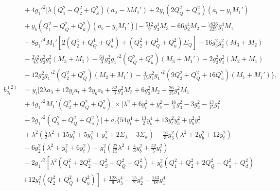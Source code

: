 \documentclass[preprint,amsmath,amssymb,aps,superscriptaddress,prd,
showpacs,floatfix,nofootinbib]{revtex4-1}
\begin{document}
\begin{subequations}
\begin{align}
\nonumber \\
& {} + 4 g_1'^2 \big [ \lambda \left ( Q_1^2 - Q_2^2 + Q_S^2 \right )
\left ( a_\lambda - \lambda M_1' \right ) + 2 y_t \left ( 2 Q_Q^2 + Q_u^2
\right ) \left ( a_t - y_t M_1' \right ) \nonumber \\
& {} + y_b \left ( Q_1^2 - Q_Q^2 + Q_d^2 \right ) \left ( a_b - y_b M_1'
\right ) \big ] - \frac{512}{9} g_3^4 M_3 - 66 g_2^4 M_2 -
\frac{7826}{225} g_1^4 M_1 \nonumber \\
& {} - 8 g_1'^4 M_1' \left [ 2 \left ( Q_2^4 + Q_Q^4 + Q_u^4 \right ) +
\left ( Q_2^2 + Q_Q^2 + Q_u^2 \right ) \Sigma_{Q} \right ] -
16 g_3^2 g_2^2 \left ( M_3 + M_2 \right ) \nonumber \\
& {} - \frac{272}{45} g_3^2 g_1^2 \left ( M_3 + M_1 \right ) -
\frac{64}{3} g_3^2 g_1'^2 \left ( Q_Q^2 + Q_u^2 \right )
\left ( M_3 + M_1' \right ) - 2 g_2^2 g_1^2 \left ( M_2 + M_1 \right )
\nonumber \\
& {} - 12 g_2^2 g_1'^2 \left ( Q_2^2 + Q_Q^2 \right ) \left ( M_2 + M_1'
\right ) - \frac{4}{15} g_1^2 g_1'^2 \left ( 9 Q_2^2 + Q_Q^2 + 16 Q_u^2
\right ) \left ( M_1 + M_1' \right ) \bigg \} ,
\label{eq:USSMTYu22BetaTwoLoop} \\
b_{a_t}^{(2)} &= y_t \bigg [ 2 \lambda a_\lambda + 12 y_t a_t + 2 y_b a_b +
\frac{32}{3} g_3^2 M_3 + 6 g_2^2 M_2 + \frac{26}{15} g_1^2 M_1 \nonumber \\
& {} + 4 g_1'^2 M_1' \left ( Q_2^2 + Q_Q^2 + Q_u^2 \right ) \bigg ] \times
\bigg [ \lambda^2 + 6 y_t^2 + y_b^2 - \frac{16}{3} g_3^2 - 3 g_2^2 -
\frac{13}{15} g_1^2 \nonumber \\
& {} - 2 g_1'^2 \left ( Q_2^2 + Q_Q^2 + Q_u^2 \right ) \bigg ] +
a_t \bigg \{ 54 y_t^4 + \frac{13}{2} y_b^4 + 13 y_t^2 y_b^2 + y_b^2 y_\tau^2
\nonumber \\
& {} + \lambda^2 \left ( \frac{5}{2} \lambda^2 + 15 y_t^2 + 5 y_b^2 + y_\tau^2
+ 2 \Sigma_\lambda + 3 \Sigma_\kappa \right ) -
\frac{16}{3} g_3^2 \left ( \lambda^2 + 2 y_b^2 + 12 y_t^2 \right ) \nonumber \\
& {} - 6 g_2^2 \left ( \lambda^2 + y_b^2 + 6 y_t^2 \right ) - g_1^2 \left (
\frac{22}{15} \lambda^2 + \frac{4}{3} y_b^2 + \frac{52}{5} y_t^2 \right )
\nonumber \\
& {} - 2 g_1'^2 \left [ \lambda^2 \left ( Q_1^2 + 2 Q_2^2 + Q_S^2 + Q_Q^2 +
Q_u^2 \right ) + y_b^2 \left ( Q_1^2 + Q_2^2 + 2 Q_Q^2 + Q_u^2 + Q_d^2
\right ) \right . \nonumber \\
& {} \left . + 12 y_t^2 \left ( Q_2^2 + Q_Q^2 + Q_u^2 \right ) \right ] +
\frac{128}{9} g_3^4 - \frac{15}{2} g_2^4 - \frac{143}{18} g_1^4 \nonumber \\

\end{align}
\end{subequations}
\end{document}
